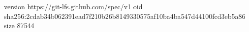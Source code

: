 version https://git-lfs.github.com/spec/v1
oid sha256:2cdab34b062391ead7f210b26b8149330575af10ba4ba547d44100fcd3eb5a86
size 87544
